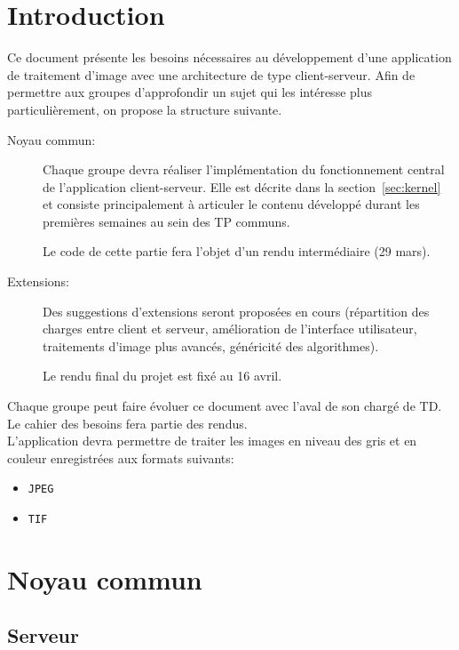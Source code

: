 \documentclass[a4paper,12pt]{article}
\newcounter{besoin}
\begin{document}
\section{Introduction}

Ce document présente les besoins nécessaires au développement d'une application
de traitement d'image avec une architecture de type client-serveur.
Afin de permettre aux groupes d'approfondir un sujet qui les intéresse plus
particulièrement, on propose la structure suivante.

\begin{description}
\item[Noyau commun:] Chaque groupe devra réaliser l'implémentation du fonctionnement central de l'application client-serveur. Elle est décrite dans la section~\ref{sec:kernel} et consiste principalement à articuler le contenu développé durant les premières semaines au sein des TP communs.

 Le code de cette partie fera l'objet d'un rendu intermédiaire (29 mars).
  
\item [Extensions: ] Des suggestions d'extensions seront proposées en cours (répartition des charges entre client et serveur, amélioration de l'interface utilisateur, traitements d'image plus avancés,  généricité des algorithmes).

  Le rendu final du projet est fixé au 16 avril.
  
\end{description}


Chaque groupe peut faire évoluer ce document avec l'aval de son chargé de TD. Le cahier des besoins fera partie des rendus.\\


L'application devra permettre de traiter les images en niveau des gris et en
couleur enregistrées aux formats suivants:

\begin{itemize}
\item \verb!JPEG!
\item \verb!TIF!
\end{itemize}



\section{\label{sec:kernel}Noyau commun}

\subsection{Serveur}
\end{document}
